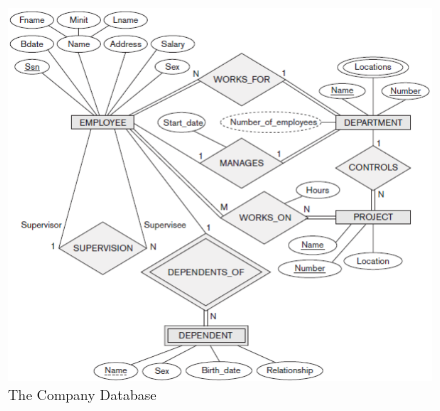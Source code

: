 \begin{center}
\begin{figure}[H]
\centering
\includegraphics[scale=0.7]{figures/tcd2.png}
\caption{The Company Database} 
\end{figure}
\end{center}

